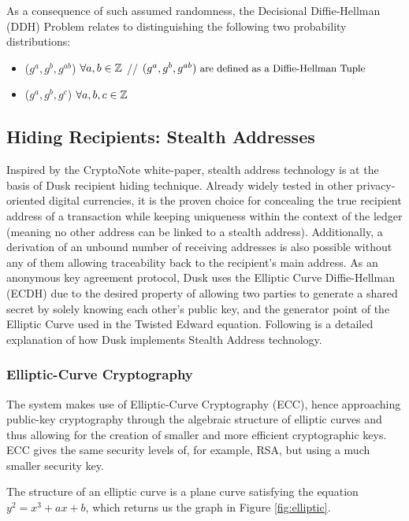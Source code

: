As a consequence of such assumed randomness, the Decisional Diffie-Hellman (DDH) Problem relates to distinguishing the following two probability distributions:

\begin{itemize}
\item ($g^a, g^b, g^{ab}$) $\forall \space a,b \in \mathbb{Z}\\$ // $\small (g^a, g^b, g^{ab}) \textrm{ are defined as a Diffie-Hellman Tuple}$
\item ($g^a, g^b, g^{c}$) $\forall \space a,b,c \in \mathbb{Z}$
\end{itemize}

\subsection{Hiding Recipients: Stealth Addresses}
Inspired by the CryptoNote white-paper\cite{CryptoNote}, stealth address technology is at the basis of \textrm{Dusk} recipient hiding technique. Already widely tested in other privacy-oriented digital currencies, it is the proven choice for concealing the true recipient address of a transaction while keeping uniqueness within the context of the ledger (meaning no other address can be linked to a stealth address). Additionally, a derivation of an unbound number of receiving addresses is also possible without any of them allowing traceability back to the recipient's main address. As an anonymous key agreement protocol, \textrm{Dusk} uses the Elliptic Curve Diffie-Hellman (ECDH) due to the desired property of allowing two parties to generate a shared secret by solely knowing each other's public key, and the generator point of the Elliptic Curve used in the Twisted Edward equation. Following is a detailed explanation of how \textrm{Dusk} implements Stealth Address technology. 

\subsubsection{Elliptic-Curve Cryptography}

The system makes use of Elliptic-Curve Cryptography (ECC), hence approaching public-key cryptography through the algebraic structure of elliptic curves and thus allowing for the creation of smaller and more efficient cryptographic keys. ECC gives the same security levels of, for example, RSA, but using a much smaller security key.

The structure of an elliptic curve is a plane curve satisfying the equation $y^2=x^3+ax+b$, which returns us the graph in Figure \ref{fig:elliptic}.


